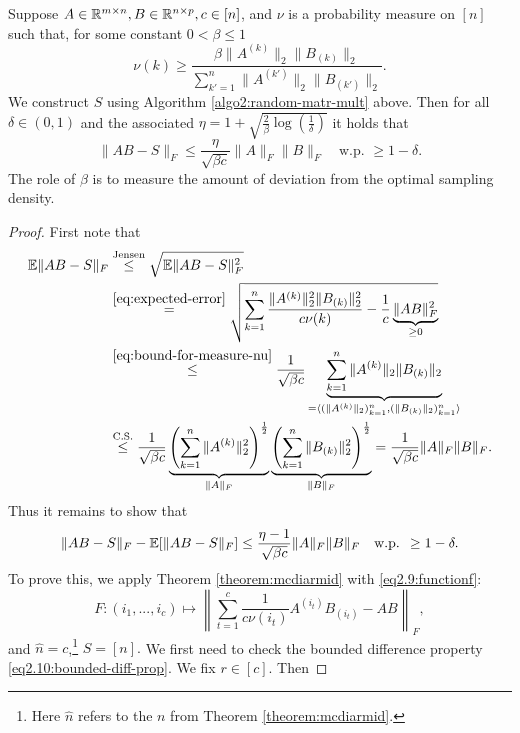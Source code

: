\begin{theorem}
Suppose $A\in \mathbb{R}^{m\times n}, B\in \mathbb{R}^{n\times p}, c\in [n]$, and $\nu$ is a probability measure on $[n]$ such that, for some constant $0<\beta\leq 1$
\begin{equation}\label{eq:bound-for-measure-nu}
\nu(k) \geq \frac{\beta \|A^{(k)}\|_2\|B_{(k)}\|_2}{\sum_{k'=1}^n \|A^{(k')}\|_2\|B_{(k')}\|_2 }.
\end{equation}
We construct $S$ using Algorithm \ref{algo2:random-matr-mult} above. Then for all $\delta \in (0,1)$ and the associated $\eta = 1+ \sqrt{\frac{2}{\beta} \log(\frac{1}{\delta})}$ it holds that 
\begin{equation}
\|AB-S\|_F \leq \frac{\eta}{\sqrt{\beta c}} \|A\|_F \|B\|_F \quad	\text{w.p. } \geq 1-\delta.
\end{equation}
The role of $\beta$ is to measure the amount of deviation from the optimal sampling density.
\begin{proof}
First note that 
\begin{equation}
\begin{split}
\mathbb{E} \|AB - S\|_F & \overset{\text{Jensen}}{\leq} \sqrt{\mathbb{E} \|AB-S\|_F^2}  \\
& \overset{\eqref{eq:expected-error}}{=} 
\sqrt{\sum_{k=1}^n \frac{\|A^{(k)}\|_2^2 \|B_{(k)}\|_2^2}{c\nu(k)} - \frac{1}{c} \underbrace{\|AB\|_F^2}_{\geq 0}} \\
& \overset{\eqref{eq:bound-for-measure-nu}}{\leq} \frac{1}{\sqrt{\beta c}} \underbrace{\sum_{k=1}^n \|A^{(k)}\|_2 \|B_{(k)}\|_2}_{= \langle (\|A^{(k)}\|_2)_{k=1}^n, (\|B_{(k)}\|_2)_{k=1}^n \rangle} \\
& \overset{\text{C.S.}}{\leq} \frac{1}{\sqrt{\beta c}} 
\underbrace{\left(
 \sum_{k=1}^n \|A^{(k)}\|_2^2
\right)^\frac{1}{2}}_{\|A\|_F}
\underbrace{\left(
 \sum_{k=1}^n \|B_{(k)}\|_2^2
\right)^\frac{1}{2}}_{\|B\|_F} = \frac{1}{\sqrt{\beta c}} \|A\|_F\|B\|_F.
\end{split}
\end{equation}
Thus it remains to show that
\begin{equation*}
\|AB-S\|_F - \mathbb{E}[\|AB-S\|_F] \leq \frac{\eta -1}{\sqrt{\beta c}} \|A\|_F \|B\|_F\quad \text{w.p. } \geq 1-\delta.
\end{equation*}
To prove this, we apply Theorem \ref{theorem:mcdiarmid} with \eqref{eq2.9:functionf}:
$$F:(i_1,...,i_c) \mapsto \left\|
\sum_{t=1}^c \frac{1}{c\nu(i_t)}A^{(i_t)} B_{(i_t)} - AB \right\|_F,$$
and $\hat{n}=c$,\footnote{Here $\hat{n}$ refers to the $n$ from Theorem \ref{theorem:mcdiarmid}.} $S=[n].$ We first need to check the bounded difference property \eqref{eq2.10:bounded-diff-prop}. We fix $r \in [c]$. Then

\end{proof}
\end{theorem}
